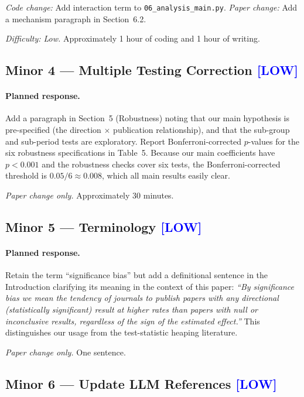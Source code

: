 \documentclass[12pt]{article}
\newcommand{\LOW}{\textcolor{blue}{\textbf{[LOW]}}}
\begin{document}
\textit{Code change:} Add interaction term to \texttt{06\_analysis\_main.py}.
\textit{Paper change:} Add a mechanism paragraph in Section~6.2.

\textit{Difficulty: Low.}  Approximately 1 hour of coding and 1 hour of
writing.

\subsection{Minor 4 --- Multiple Testing Correction \LOW}

\paragraph{Planned response.}
Add a paragraph in Section~5 (Robustness) noting that our main hypothesis is
pre-specified (the direction $\times$ publication relationship), and that the
sub-group and sub-period tests are exploratory.  Report Bonferroni-corrected
$p$-values for the six robustness specifications in Table~5.  Because our
main coefficients have $p < 0.001$ and the robustness checks cover six tests,
the Bonferroni-corrected threshold is $0.05 / 6 \approx 0.008$, which all
main results easily clear.

\textit{Paper change only.}  Approximately 30 minutes.

\subsection{Minor 5 --- Terminology \LOW}

\paragraph{Planned response.}
Retain the term ``significance bias'' but add a definitional sentence in the
Introduction clarifying its meaning in the context of this paper:
\textit{``By significance bias we mean the tendency of journals to publish
papers with any directional (statistically significant) result at higher rates
than papers with null or inconclusive results, regardless of the sign of the
estimated effect.''}  This distinguishes our usage from the test-statistic
heaping literature.

\textit{Paper change only.}  One sentence.

\subsection{Minor 6 --- Update LLM References \LOW}
\end{document}
